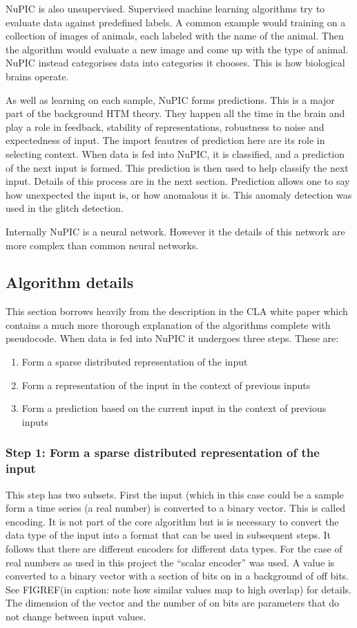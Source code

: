 \documentclass[a4paper]{jpconf}
\begin{document}
		NuPIC is also unsupervised. Supervised machine learning algorithms try to evaluate data against predefined labels. A common example would training on a collection of images of animals, each labeled with the name of the animal. Then the algorithm would evaluate a new image and come up with the type of animal. NuPIC instead categorises data into categories it chooses. This is how biological brains operate.
		
		As well as learning on each sample, NuPIC forms predictions. This is a major part of the background HTM theory. They happen all the time in the brain and play a role in feedback, stability of representations, robustness to noise and expectedness of input. The import feautres of prediction here are its role in selecting context. When data is fed into NuPIC, it is classified, and a prediction of the next input is formed. This prediction is then used to help classify the next input. Details of this process are in the next section. Prediction allows one to say how unexpected the input is, or how anomalous it is. This anomaly detection was used in the glitch detection.
		
		Internally NuPIC is a neural network. However it the details of this network are more complex than common neural networks.
		
	\subsection{Algorithm details}
		This section borrows heavily from the description in the CLA white paper which contains a much more thorough explanation of the algorithms complete with pseudocode. When data is fed into NuPIC it undergoes three steps. These are:
		\begin{enumerate}
			\item Form a sparse distributed representation of the input
			\item Form a representation of the input in the context of previous inputs
			\item Form a prediction based on the current input in the context of previous inputs
		\end{enumerate}
		\subsubsection{Step 1: Form a sparse distributed representation of the input}
			This step has two subsets. First the input (which in this case could be a sample form a time series (a real number) is converted to a binary vector. This is called encoding. It is not part of the core algorithm but is is necessary to convert the data type of the input into a format that can be used in subsequent steps. It follows that there are different encoders for different data types. For the case of real numbers as used in this project the ``scalar encoder'' was used. A value is converted to a binary vector with a section of bits on in a background of off bits. See FIGREF(in caption: note how similar values map to high overlap) for details. The dimension of the vector and the number of on bits are parameters that do not change between input values.
			
\end{document}
